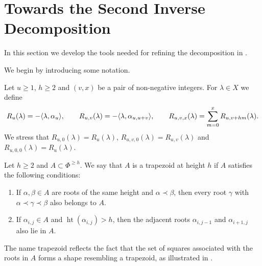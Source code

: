 
\section{Towards the Second Inverse Decomposition}\label{sec: Towards the Second Inverse Decomposition}

In this section we develop the tools needed for refining the decomposition  in . 

We begin by introducing some notation. 

\begin{definition} \rm
Let $u \geq 1$, $h \geq 2$ and $(v,x)$ be a pair of non-negative integers. 
For $\lambda \in X$ we define
\begin{equation}
 R_u(\lambda) = -\langle \lambda , \alpha_u \rangle,
    \qquad R_{u,v}(\lambda) = -\langle \lambda , \alpha_{u,u+v} \rangle,
    \qquad  R_{u,v,x}(\lambda) = \displaystyle \sum_{m=0}^{x} R_{u,v+hm}(\lambda).   
\end{equation}
We stress that $R_{u,0}(\lambda) = R_u(\lambda)$,  $R_{u,v,0}(\lambda) = R_{u,v}(\lambda)$ and $R_{u,0,0}(\lambda) = R_u(\lambda)$. 
\end{definition}


\begin{definition}\rm \label{def: Trapecio}
    Let $h\geq 2$ and $A \subset \Phi^{\geq h}$. 
    We say that $A$ is a trapezoid at height $h$ if $A$ satisfies the following conditions:
    \begin{enumerate}
        \item  If $\alpha, \beta \in A$ are roots of the same height and $\alpha \prec \beta$, then every root $\gamma$ with $\alpha \prec \gamma \prec \beta$ also belongs to $A$.
        
        \item  If $\alpha_{i,j} \in A$ and $\operatorname{ht}(\alpha_{i,j}) > h$, then the adjacent roots $\alpha_{i,j-1}$ and $\alpha_{i+1,j}$ also lie in $A$.
    \end{enumerate}
    The name  trapezoid reflects the fact that the set of squares associated with the roots in $A$ forms a shape resembling a trapezoid, as illustrated in .
\end{definition}

